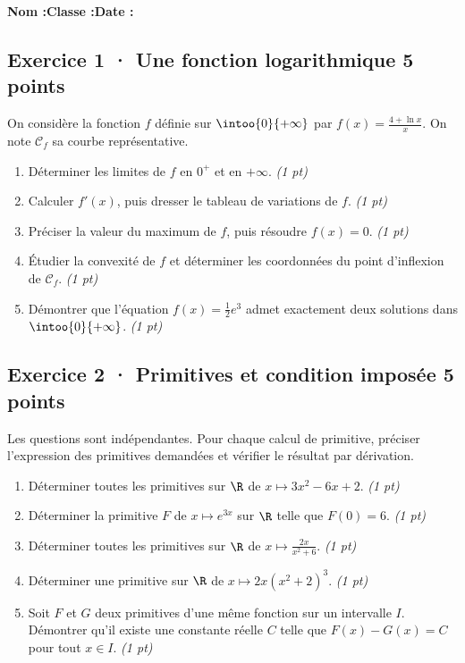 \smallskip\textbf{Nom :}\enspace\dotfill\quad\textbf{Classe :}\enspace\dotfill\quad\textbf{Date :}\enspace\dotfill

\subsection*{Exercice 1 · Une fonction logarithmique \hfill 5 points}On considère la fonction $f$ définie sur $\intoo{0}{+\infty}$ par $f(x)=\frac{4+\ln x}x$. On note $\mathcal C_f$ sa courbe représentative.

\begin{enumerate}

\item Déterminer les limites de $f$ en $0^+$ et en $+\infty$. \hfill\textit{(1 pt)}

\item Calculer $f' (x)$, puis dresser le tableau de variations de $f$. \hfill\textit{(1 pt)}

\item Préciser la valeur du maximum de $f$, puis résoudre $f(x)=0$. \hfill\textit{(1 pt)}

\item Étudier la convexité de $f$ et déterminer les coordonnées du point d'inflexion de $\mathcal C_f$. \hfill\textit{(1 pt)}

\item Démontrer que l'équation $f(x)=\frac12 e^{3}$ admet exactement deux solutions dans $\intoo{0}{+\infty}$. \hfill\textit{(1 pt)}

\end{enumerate}

\subsection*{Exercice 2 · Primitives et condition imposée \hfill 5 points}Les  questions sont indépendantes. Pour chaque calcul de primitive, préciser l'expression des primitives demandées et vérifier le résultat par dérivation.

\begin{enumerate}

\item Déterminer toutes les primitives sur $\R$ de $x\mapsto 3x^2-6x+2$. \hfill\textit{(1 pt)}

\item Déterminer la primitive $F$ de $x\mapsto e^{3x}$ sur $\R$ telle que $F(0)=6$. \hfill\textit{(1 pt)}

\item Déterminer toutes les primitives sur $\R$ de $x\mapsto\frac{2x}{x^2+6}$. \hfill\textit{(1 pt)}

\item Déterminer une primitive sur $\R$ de $x\mapsto2x(x^2+2)^{3}$. \hfill\textit{(1 pt)}

\item Soit $F$ et $G$ deux primitives d'une même fonction sur un intervalle $I$. Démontrer qu'il existe une constante réelle $C$ telle que $F(x)-G(x)=C$ pour tout $x\in I$. \hfill\textit{(1 pt)}

\end{enumerate}

